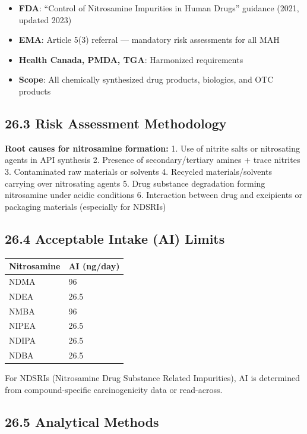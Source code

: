 \documentclass[
  11pt,
  a4paper,
]{report}
\providecommand{\tightlist}{%
  \setlength{\itemsep}{0pt}\setlength{\parskip}{0pt}}
\begin{document}
\begin{itemize}
\tightlist
\item
  \textbf{FDA}: ``Control of Nitrosamine Impurities in Human Drugs''
  guidance (2021, updated 2023)
\item
  \textbf{EMA}: Article 5(3) referral --- mandatory risk assessments for
  all MAH
\item
  \textbf{Health Canada, PMDA, TGA}: Harmonized requirements
\item
  \textbf{Scope}: All chemically synthesized drug products, biologics,
  and OTC products
\end{itemize}

\hypertarget{risk-assessment-methodology}{%
\subsection{26.3 Risk Assessment
Methodology}\label{risk-assessment-methodology}}

\textbf{Root causes for nitrosamine formation:} 1. Use of nitrite salts
or nitrosating agents in API synthesis 2. Presence of secondary/tertiary
amines + trace nitrites 3. Contaminated raw materials or solvents 4.
Recycled materials/solvents carrying over nitrosating agents 5. Drug
substance degradation forming nitrosamine under acidic conditions 6.
Interaction between drug and excipients or packaging materials
(especially for NDSRIs)

\hypertarget{acceptable-intake-ai-limits}{%
\subsection{26.4 Acceptable Intake (AI)
Limits}\label{acceptable-intake-ai-limits}}

\begin{longtable}[]{@{}ll@{}}
\toprule
Nitrosamine & AI (ng/day)\tabularnewline
\midrule
\endhead
NDMA & 96\tabularnewline
NDEA & 26.5\tabularnewline
NMBA & 96\tabularnewline
NIPEA & 26.5\tabularnewline
NDIPA & 26.5\tabularnewline
NDBA & 26.5\tabularnewline
\bottomrule
\end{longtable}

For NDSRIs (Nitrosamine Drug Substance Related Impurities), AI is
determined from compound-specific carcinogenicity data or read-across.

\hypertarget{analytical-methods}{%
\subsection{26.5 Analytical Methods}\label{analytical-methods}}
\end{document}
